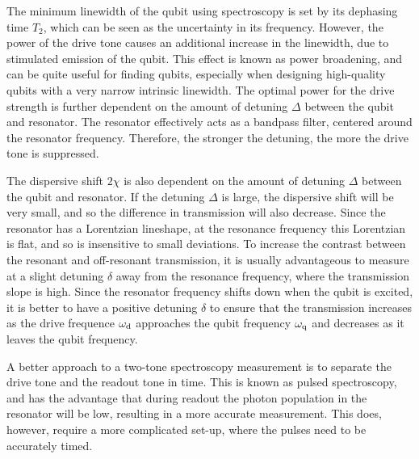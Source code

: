        The minimum linewidth of the qubit using spectroscopy is set by its dephasing time $T_2$, which can be seen as the uncertainty in its frequency. However, the power of the drive tone causes an additional increase in the linewidth, due to stimulated emission of the qubit. This effect is known as power broadening, and can be quite useful for finding qubits, especially when designing high-quality qubits with a very narrow intrinsic linewidth. The optimal power for the drive strength is further dependent on the amount of detuning $\Delta$ between the qubit and resonator. The resonator effectively acts as a bandpass filter, centered around the resonator frequency. Therefore, the stronger the detuning, the more the drive tone is suppressed.


        The dispersive shift $2 \chi$ is also dependent on the amount of detuning $\Delta$ between the qubit and resonator. If the detuning $\Delta$ is large, the dispersive shift will be very small, and so the difference in transmission will also decrease. Since the resonator has a Lorentzian lineshape, at the resonance frequency this Lorentzian is flat, and so is insensitive to small deviations. To increase the contrast between the resonant and off-resonant transmission, it is usually advantageous to measure at a slight detuning $\delta$ away from the resonance frequency, where the transmission slope is high. Since the resonator frequency shifts down when the qubit is excited, it is better to have a positive detuning $\delta$ to ensure that the transmission increases as the drive frequence $\omega_\text{d}$ approaches the qubit frequency $\omega_\text{q}$ and decreases as it leaves the qubit frequency.

        A better approach to a two-tone spectroscopy measurement is to separate the drive tone and the readout tone in time. This is known as pulsed spectroscopy, and has the advantage that during readout the photon population in the resonator will be low, resulting in a more accurate measurement. This does, however, require a more complicated set-up, where the pulses need to be accurately timed.


